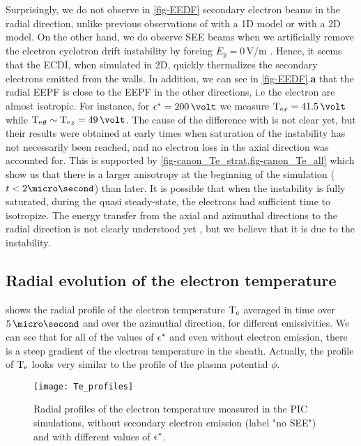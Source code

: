      Surprisingly, we do not observe in \cref{fig-EEDF} secondary electron beams in the radial  direction, unlike previous observations of \citet{sydorenko2006} with a 1D model or \citet{heron2013} with a 2D model.
     On the other hand, we do observe SEE beams when  we artificially remove the electron cyclotron drift instability by forcing $E_y = 0$\,V/m \citep{croes2017}.
     Hence, it seems that the ECDI, when simulated in 2D, quickly thermalizes the secondary electrons emitted from the walls.
     In addition, we can see in \cref{fig-EEDF}.{\bf a} that the radial EEPF is close to the EEPF in the other directions, i.e the electron are almost isotropic.
     For instance, for $\crover = 200\,\volt$  we measure $\Te_r = 41.5\,\volt$ while $\Te_{\theta} \sim \Te_z = 49\,\volt$.
     The cause of the difference with \citet{heron2013} is not clear yet, but their results were  obtained at early times when saturation of the instability has not necessarily been reached, and no electron loss in  the axial direction was accounted for.
     This is supported by \cref{fig-canon_Te_strat,fig-canon_Te_all} which show us that there is a larger anisotropy at the beginning of the simulation ($t<2\micro\second$) than later.
     It is possible that when the instability is fully saturated, during the quasi steady-state, the electrons had sufficient time to isotropize.
     The energy transfer from the axial and azimuthal directions to the radial direction is not clearly understood
     yet \citep{janhunen2018}, but we believe that it is due to the instability.



   \subsection{Radial evolution of the electron temperature}
     \label{subsec-Radial_Te}
     
      shows the radial profile of the electron temperature $\mathrm{T_e}$ averaged in time over $5\,\micro\second$ and over the azimuthal direction, for different emissivities.
     We can see that for all of the values of $\epsilon^{*}$ and even without electron emission, there is a steep gradient of the electron temperature in the sheath.
     Actually, the profile of $\mathrm{T_e}$ looks very similar to the profile of the plasma potential $\phi$.
   
   \begin{figure}[!hbt]
     \centering
     \texttt{[image: Te\_profiles]}
     \caption{Radial profiles of the electron temperature measured in the \acs{PIC} simulations, without secondary electron emission (label "no SEE") and with different values of $\epsilon^{*}$.}
     \label{fig-te_profile_see}
   \end{figure}


